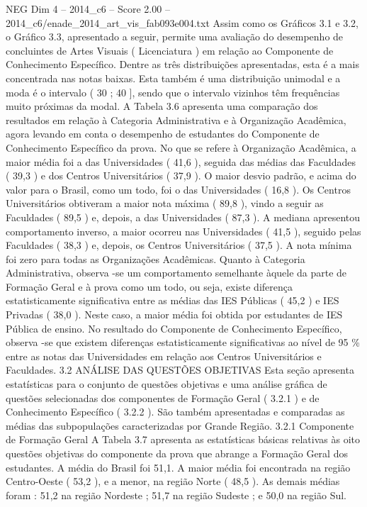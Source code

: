 \begin{textsample}{NEG Dim 4 – 2014\_c6 – Score 2.00 – 2014\_c6/enade\_2014\_art\_vis\_fab093e004.txt}
Assim como os Gráficos 3.1 e 3.2, o Gráfico 3.3, apresentado a seguir, permite uma avaliação do desempenho de concluintes de Artes Visuais ( Licenciatura ) em relação ao Componente de Conhecimento Específico.
Dentre as três distribuições apresentadas, esta é a mais concentrada nas notas baixas.
Esta também é uma distribuição unimodal e a moda é o intervalo ( 30 ; 40 ], sendo que o intervalo vizinhos têm frequências muito próximas da modal.
A Tabela 3.6 apresenta uma comparação dos resultados em relação à Categoria Administrativa e à Organização Acadêmica, agora levando em conta o desempenho de estudantes do Componente de Conhecimento Específico da prova.
No que se refere à Organização Acadêmica, a maior média foi a das Universidades ( 41,6 ), seguida das médias das Faculdades ( 39,3 ) e dos Centros Universitários ( 37,9 ).
O maior desvio padrão, e acima do valor para o Brasil, como um todo, foi o das Universidades ( 16,8 ).
Os Centros Universitários obtiveram a maior nota máxima ( 89,8 ), vindo a seguir as Faculdades ( 89,5 ) e, depois, a das Universidades ( 87,3 ).
A mediana apresentou comportamento inverso, a maior ocorreu nas Universidades ( 41,5 ), seguido pelas Faculdades ( 38,3 ) e, depois, os Centros Universitários ( 37,5 ).
A nota mínima foi zero para todas as Organizações Acadêmicas.
Quanto à Categoria Administrativa, observa -se um comportamento semelhante àquele da parte de Formação Geral e à prova como um todo, ou seja, existe diferença estatisticamente significativa entre as médias das IES Públicas ( 45,2 ) e IES Privadas ( 38,0 ).
Neste caso, a maior média foi obtida por estudantes de IES Pública de ensino.
No resultado do Componente de Conhecimento Específico, observa -se que existem diferenças estatisticamente significativas ao nível de 95 \% entre as notas das Universidades em relação aos Centros Universitários e Faculdades. 3.2 ANÁLISE DAS QUESTÕES OBJETIVAS Esta seção apresenta estatísticas para o conjunto de questões objetivas e uma análise gráfica de questões selecionadas dos componentes de Formação Geral ( 3.2.1 ) e de Conhecimento Específico ( 3.2.2 ).
São também apresentadas e comparadas as médias das subpopulações caracterizadas por Grande Região. 3.2.1 Componente de Formação Geral A Tabela 3.7 apresenta as estatísticas básicas relativas às oito questões objetivas do componente da prova que abrange a Formação Geral dos estudantes.
A média do Brasil foi 51,1.
A maior média foi encontrada na região Centro-Oeste ( 53,2 ), e a menor, na região Norte ( 48,5 ).
As demais médias foram : 51,2 na região Nordeste ; 51,7 na região Sudeste ; e 50,0 na região Sul.

\end{textsample}
